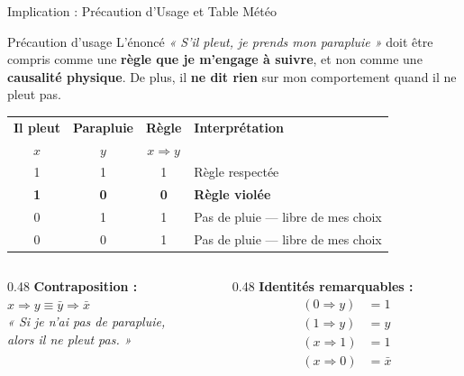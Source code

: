 \begin{frame}[shrink=10] {Implication : Précaution d'Usage et Table Météo}

    \begin{alertblock}{Précaution d'usage}
        L'énoncé \textit{« S'il pleut, je prends mon parapluie »} doit être compris comme une \textbf{règle que je m'engage à suivre}, et non comme une \textbf{causalité physique}. De plus, il \textbf{ne dit rien} sur mon comportement quand il ne pleut pas.
    \end{alertblock}

    \vspace{0.1cm}

    \centering
    \renewcommand{\arraystretch}{1.3}
    \begin{tabular}{|c|c|c|l|}
        \hline
        \textbf{Il pleut} & \textbf{Parapluie} & \textbf{Règle} & \textbf{Interprétation} \\
        \(x\) & \(y\) & \(x \Rightarrow y\) & \\
        \hline
        1 & 1 & 1 & Règle respectée \\
        \textbf{1} & \textbf{0} & \textbf{0} & \textbf{Règle violée} \\
        0 & 1 & 1 & Pas de pluie — libre de mes choix \\
        0 & 0 & 1 & Pas de pluie — libre de mes choix \\
        \hline
    \end{tabular}

    \vspace{0.2cm}

    \begin{columns}[T]
        \begin{column}{0.48\textwidth}
            \textbf{Contraposition :}\\
            \(x \Rightarrow y \equiv \bar{y} \Rightarrow \bar{x}\)\\
            \textit{« Si je n'ai pas de parapluie,}\\
            \textit{alors il ne pleut pas. »}
        \end{column}
        \begin{column}{0.48\textwidth}
          \textbf{Identités remarquables :}
          \begin{align*}
            (0 \Rightarrow y) &= 1 \\
            (1 \Rightarrow y) &= y \\
            (x \Rightarrow 1) &= 1 \\
            (x \Rightarrow 0) &= \bar{x}
          \end{align*}
        \end{column}
    \end{columns}

\end{frame}

